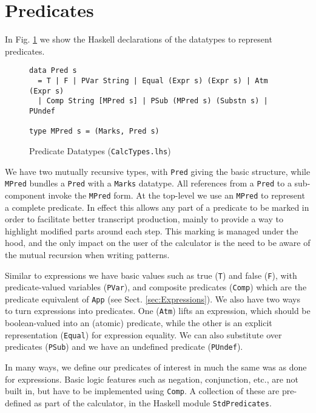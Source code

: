 \section{Predicates}\label{sec:Predicates}

In Fig. \ref{fig:pred-types} we show the Haskell declarations
of the datatypes to represent predicates.
\begin{figure}[tb]
\begin{verbatim}
data Pred s
  = T | F | PVar String | Equal (Expr s) (Expr s) | Atm (Expr s)
  | Comp String [MPred s] | PSub (MPred s) (Substn s) | PUndef

type MPred s = (Marks, Pred s)
\end{verbatim}
  \caption{Predicate Datatypes (\texttt{CalcTypes.lhs})}
  \label{fig:pred-types}
\end{figure}
We have two mutually recursive types,
with \texttt{Pred} giving the basic structure,
while \texttt{MPred} bundles a \texttt{Pred} 
with a \texttt{Marks} datatype.
All references from a \texttt{Pred} to a sub-component invoke
the \texttt{MPred} form.
At the top-level we use an \texttt{MPred} to represent a complete predicate.
In effect this allows any part of a predicate to be marked
in order to facilitate better transcript production,
mainly to provide a way to highlight modified parts
around each step.
This marking is managed under the hood,
and the only impact on the user of the calculator
is the need to be aware of the mutual recursion
when writing patterns.

Similar to expressions we have basic values such as true (\texttt{T})
and false (\texttt{F}),
 with predicate-valued variables (\texttt{PVar}),
and composite predicates (\texttt{Comp}) which are the predicate equivalent
of \texttt{App} (see Sect. \ref{sec:Expressions}).
We also have two ways to turn expressions into predicates.
One (\texttt{Atm}) lifts an expression, which should be boolean-valued
into an (atomic) predicate,
while the other is an explicit representation (\texttt{Equal})
for expression equality.
We can also substitute over predicates (\texttt{PSub})
and we have an undefined predicate (\texttt{PUndef}).

In many ways,
we define our predicates of interest
in much the same was as done for expressions.
Basic logic features such as negation, conjunction, etc.,
are not built in,
but have to be implemented using \texttt{Comp}.
A collection of these are pre-defined as part of the calculator,
in the Haskell module \texttt{StdPredicates}.

